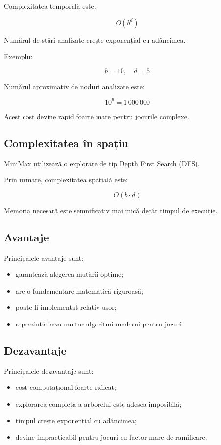 \documentclass[12pt,a4paper]{article}
\begin{document}
Complexitatea temporală este:

\[
O(b^d)
\]

Numărul de stări analizate crește exponențial cu adâncimea.

Exemplu:

\[
b=10,\quad d=6
\]

Numărul aproximativ de noduri analizate este:

\[
10^6 = 1\,000\,000
\]

Acest cost devine rapid foarte mare pentru jocurile complexe.

\subsection{Complexitatea în spațiu}

MiniMax utilizează o explorare de tip Depth First Search (DFS).

Prin urmare, complexitatea spațială este:

\[
O(b \cdot d)
\]

Memoria necesară este semnificativ mai mică decât timpul de execuție.

\subsection{Avantaje}

Principalele avantaje sunt:

\begin{itemize}
\item garantează alegerea mutării optime;
\item are o fundamentare matematică riguroasă;
\item poate fi implementat relativ ușor;
\item reprezintă baza multor algoritmi moderni pentru jocuri.
\end{itemize}

\subsection{Dezavantaje}

Principalele dezavantaje sunt:

\begin{itemize}
\item cost computațional foarte ridicat;
\item explorarea completă a arborelui este adesea imposibilă;
\item timpul crește exponențial cu adâncimea;
\item devine impracticabil pentru jocuri cu factor mare de ramificare.
\end{itemize}
\end{document}
